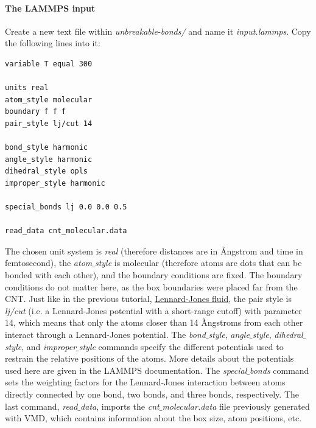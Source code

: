 \documentclass[9pt,tutorial]{livecoms}
\begin{document}
\paragraph{The LAMMPS input}
Create a new text file within \textit{unbreakable-bonds/} and name it \textit{input.lammps}. Copy the following lines into it:
{\normalsize \begin{verbatim}
variable T equal 300

units real
atom_style molecular
boundary f f f
pair_style lj/cut 14

bond_style harmonic
angle_style harmonic
dihedral_style opls
improper_style harmonic

special_bonds lj 0.0 0.0 0.5

read_data cnt_molecular.data
\end{verbatim}}
The chosen unit system is \textit{real} (therefore distances are in Ångstrom and time in femtosecond), the \textit{atom$\_$style} is molecular (therefore atoms are dots that can be bonded with each other), and the boundary conditions are fixed. The boundary conditions do not matter here, as the box boundaries were placed far from the CNT. Just like in the previous tutorial, \hyperref[lennard-jones-label]{Lennard-Jones fluid}, the pair style is \textit{lj/cut} (i.e. a Lennard-Jones potential with a short-range cutoff) with parameter 14, which means that only the atoms closer than 14 Ångstroms from each other interact through a Lennard-Jones potential. The \textit{bond$\_$style}, \textit{angle$\_$style}, \textit{dihedral$\_$style}, and \textit{improper$\_$style} commands specify the different potentials used to restrain the relative positions of the atoms. More details about the potentials used here are given in the LAMMPS documentation. The \textit{special$\_$bonds} command sets the weighting factors for the Lennard-Jones interaction between atoms directly connected by one bond, two bonds, and three bonds, respectively. The last command, \textit{read$\_$data}, imports the \textit{cnt$\_$molecular.data} file previously generated with VMD, which contains information about the box size, atom positions, etc.
\end{document}
